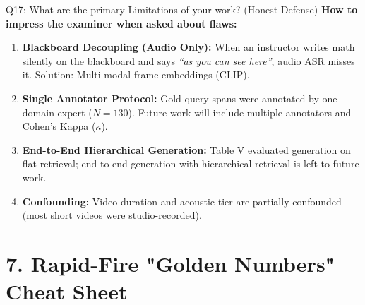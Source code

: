 \documentclass[10pt,a4paper]{article}
\begin{document}
\begin{quesbox}{Q17: What are the primary Limitations of your work? (Honest Defense)}
\textbf{How to impress the examiner when asked about flaws:}
\begin{enumerate}[leftmargin=*]
    \item \textbf{Blackboard Decoupling (Audio Only):} When an instructor writes math silently on the blackboard and says \textit{``as you can see here''}, audio ASR misses it. Solution: Multi-modal frame embeddings (CLIP).
    \item \textbf{Single Annotator Protocol:} Gold query spans were annotated by one domain expert ($N=130$). Future work will include multiple annotators and Cohen's Kappa ($\kappa$).
    \item \textbf{End-to-End Hierarchical Generation:} Table V evaluated generation on flat retrieval; end-to-end generation with hierarchical retrieval is left to future work.
    \item \textbf{Confounding:} Video duration and acoustic tier are partially confounded (most short videos were studio-recorded).
\end{enumerate}
\end{quesbox}

\section*{\color{primary} 7. Rapid-Fire "Golden Numbers" Cheat Sheet}
\end{document}
